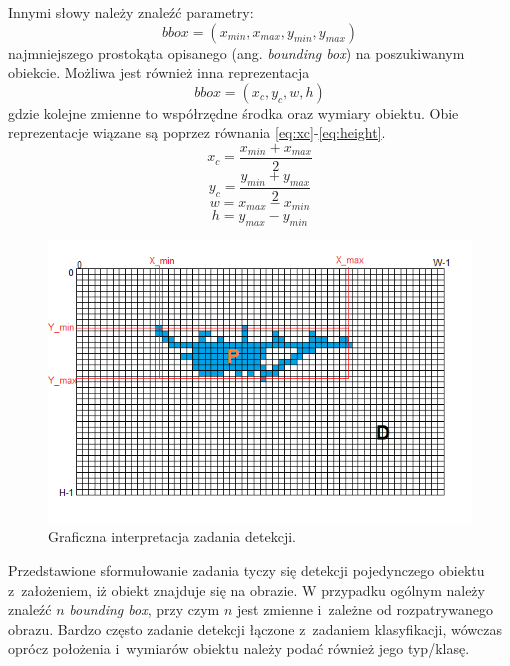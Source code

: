 Innymi słowy należy znaleźć parametry:
\begin{equation}
bbox = (x_{min},x_{max},y_{min},y_{max})
\label{eq:bbox_xxyy}
\end{equation}
najmniejszego prostokąta opisanego (ang. \emph{bounding box}) na poszukiwanym obiekcie.
Możliwa jest również inna reprezentacja
\begin{equation}
bbox = (x_c,y_c, w,h)
\label{eq:bbox_xywh}
\end{equation}
gdzie kolejne zmienne to współrzędne  środka  oraz wymiary obiektu. Obie reprezentacje wiązane są poprzez równania \eqref{eq:xc}-\eqref{eq:height}.
\begin{equation}
x_c = \frac{x_{min} + x_{max}}{2}
\label{eq:xc}
\end{equation}
\begin{equation}
y_c = \frac{y_{min} + y_{max}}{2}
\label{eq:yc}
\end{equation}
\begin{equation}
w = x_{max} - x_{min}
\label{eq:width}
\end{equation}
\begin{equation}
h = y_{max} - y_{min}
\label{eq:height}
\end{equation}

\begin{figure}
    \centering
    \includegraphics[width=0.9\linewidth]{images/grid_obj.png}
    \caption{Graficzna interpretacja zadania detekcji.}
    \label{fig:det_grid}
\end{figure}

Przedstawione sformułowanie zadania tyczy się detekcji pojedynczego obiektu z~założeniem, iż obiekt znajduje się na obrazie. 
W przypadku ogólnym należy znaleźć $n$ \emph{bounding box}, przy czym $n$ jest zmienne i~zależne od rozpatrywanego obrazu.
Bardzo często zadanie detekcji łączone z~zadaniem klasyfikacji, wówczas oprócz położenia i~wymiarów obiektu należy podać również jego typ/klasę. 

